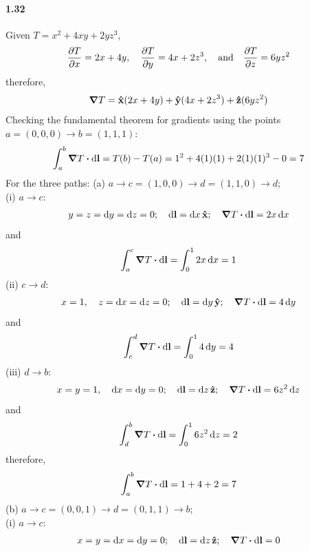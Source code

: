 \documentclass[../main.tex]{subfiles}
\begin{document}
\paragraph{1.32}
Given $T = x^2 + 4xy + 2yz^3$,
\begin{align*}
    \pdv{T}{x} = 2x + 4y  ,\quad     \pdv{T}{y} = 4x + 2z^3  ,\qand   \pdv{T}{z} = 6yz^2
\end{align*}
therefore,
\begin{align*}
    \grad{T} = \vu{x}(2x + 4y) + \vu{y}(4x + 2z^3) + \vu{z}(6yz^2)
\end{align*}
Checking the fundamental theorem for gradients using the points $a = (0,0,0) \to b = (1,1,1)$:
\begin{align*}
    \int_a^b \grad{T} \vdot \dd{\vb{l}} = T(b) - T(a) = 1^2 + 4(1)(1) + 2(1)(1)^3 - 0 = 7
\end{align*}
For the three paths:
(a) $a \to  c = (1,0,0) \to d = (1,1,0) \to d$; \\
(i) $a \to c$:
\begin{align*}
    y = z = \dd{y} = \dd{z} = 0; \quad \dd{\vb{l}} = \dd{x} \vu{x};
        \quad \grad{T} \vdot \dd{\vb{l}} = 2x \dd{x}
\end{align*}
and
\begin{align*}
    \int_a^c \grad{T} \vdot \dd{\vb{l}} = \int_0^1 2x \dd{x} = 1
\end{align*}
(ii) $c \to d$:
\begin{align*}
    x = 1, \quad z = \dd{x} = \dd{z} = 0; \quad \dd{\vb{l}} = \dd{y} \vu{y};
        \quad \grad{T} \vdot \dd{\vb{l}} = 4 \dd{y}
\end{align*}
and
\begin{align*}
    \int_c^d \grad{T} \vdot \dd{\vb{l}} = \int_0^1 4 \dd{y} = 4
\end{align*}
(iii) $d \to b$:
\begin{align*}
    x = y = 1, \quad \dd{x} = \dd{y} = 0; \quad \dd{\vb{l}} = \dd{z} \vu{z};
        \quad \grad{T} \vdot \dd{\vb{l}} = 6z^2 \dd{z}
\end{align*}
and
\begin{align*}
    \int_d^b \grad{T} \vdot \dd{\vb{l}} = \int_0^1 6z^2 \dd{z} = 2
\end{align*}
therefore,
\begin{align*}
    \int_a^b \grad{T} \vdot \dd{\vb{l}} = 1 + 4 + 2 = 7
\end{align*}
(b) $a \to  c = (0,0,1) \to d = (0,1,1) \to b$; \\
(i) $a \to c$:
\begin{align*}
    x = y = \dd{x} = \dd{y} = 0; \quad \dd{\vb{l}} = \dd{z} \vu{z};
        \quad \grad{T} \vdot \dd{\vb{l}} = 0
\end{align*}
\end{document}
